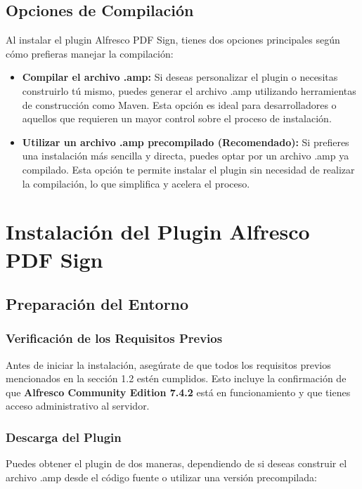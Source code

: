 \documentclass{ol-softwaremanual}
\begin{document}
\subsection{Opciones de Compilación}
Al instalar el plugin Alfresco PDF Sign, tienes dos opciones principales según cómo prefieras manejar la compilación:

\begin{itemize}
	\item \textbf{Compilar el archivo .amp:} Si deseas personalizar el plugin o necesitas construirlo tú mismo, puedes generar el archivo .amp utilizando herramientas de construcción como Maven. Esta opción es ideal para desarrolladores o aquellos que requieren un mayor control sobre el proceso de instalación.
	\item \textbf{Utilizar un archivo .amp precompilado (Recomendado):} Si prefieres una instalación más sencilla y directa, puedes optar por un archivo .amp ya compilado. Esta opción te permite instalar el plugin sin necesidad de realizar la compilación, lo que simplifica y acelera el proceso.
\end{itemize}

\section{Instalación del Plugin Alfresco PDF Sign}
\subsection{Preparación del Entorno}
\subsubsection{Verificación de los Requisitos Previos}
Antes de iniciar la instalación, asegúrate de que todos los requisitos previos mencionados en la sección 1.2 estén cumplidos. Esto incluye la confirmación de que \textbf{Alfresco Community Edition 7.4.2} está en funcionamiento y que tienes acceso administrativo al servidor.

\subsubsection{Descarga del Plugin}
Puedes obtener el plugin de dos maneras, dependiendo de si deseas construir el archivo .amp desde el código fuente o utilizar una versión precompilada:
\end{document}
